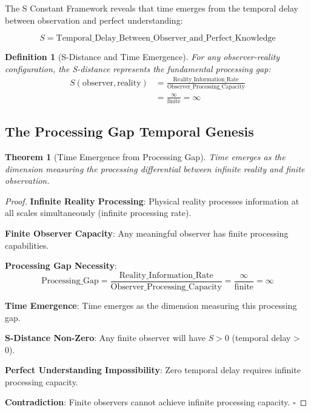 \documentclass[12pt,a4paper]{article}
\newtheorem{theorem}{Theorem}
\newtheorem{definition}{Definition}
\begin{document}
The S Constant Framework reveals that time emerges from the temporal delay between observation and perfect understanding:

\begin{equation}
S = \text{Temporal\_Delay\_Between\_Observer\_and\_Perfect\_Knowledge}
\end{equation}

\begin{definition}[S-Distance and Time Emergence]
For any observer-reality configuration, the S-distance represents the fundamental processing gap:
\begin{align}
S(\text{observer}, \text{reality}) &= \frac{\text{Reality\_Information\_Rate}}{\text{Observer\_Processing\_Capacity}} \\
&= \frac{\infty}{\text{finite}} = \infty
\end{align}
\end{definition}

\subsection{The Processing Gap Temporal Genesis}

\begin{theorem}[Time Emergence from Processing Gap]
Time emerges as the dimension measuring the processing differential between infinite reality and finite observation.
\end{theorem}

\begin{proof}
\textbf{Infinite Reality Processing}: Physical reality processes information at all scales simultaneously (infinite processing rate).

\textbf{Finite Observer Capacity}: Any meaningful observer has finite processing capabilities.

\textbf{Processing Gap Necessity}: 
\begin{equation}
\text{Processing\_Gap} = \frac{\text{Reality\_Information\_Rate}}{\text{Observer\_Processing\_Capacity}} = \frac{\infty}{\text{finite}} = \infty
\end{equation}

\textbf{Time Emergence}: Time emerges as the dimension measuring this processing gap.

\textbf{S-Distance Non-Zero}: Any finite observer will have $S > 0$ (temporal delay > 0).

\textbf{Perfect Understanding Impossibility}: Zero temporal delay requires infinite processing capacity.

\textbf{Contradiction}: Finite observers cannot achieve infinite processing capacity. $\square$
\end{proof}
\end{document}
